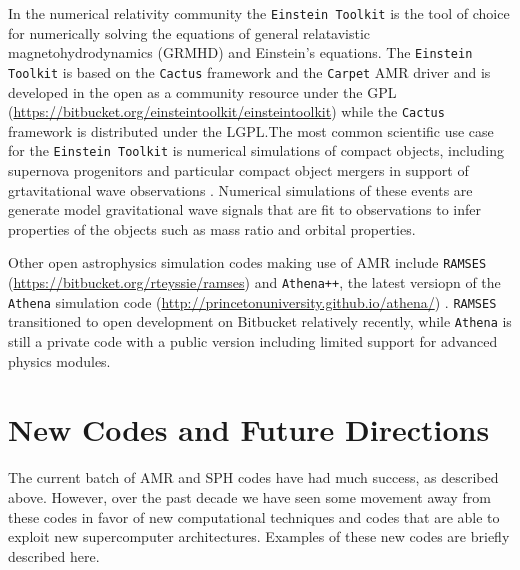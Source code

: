\documentclass[11pt,twoside]{article}
\begin{document}
In the numerical relativity community the \texttt{Einstein Toolkit} \citep{loffler2012} is the tool of choice for numerically solving the equations of general relatavistic magnetohydrodynamics (GRMHD) and Einstein's equations. The \texttt{Einstein Toolkit} is based on the \texttt{Cactus} framework and the \texttt{Carpet} AMR driver and is developed in the open as a community resource under the GPL \citep{loffler2013} (\url{https://bitbucket.org/einsteintoolkit/einsteintoolkit}) while the \texttt{Cactus} framework is distributed under the LGPL.\@  The most common scientific use case for the \texttt{Einstein Toolkit} is numerical simulations of compact objects, including supernova progenitors \citep{mosta2014} and particular compact object mergers in support of grtavitational wave observations \citep{ajith2012}. Numerical simulations of these events are generate model gravitational wave signals that are fit to observations to infer properties of the objects such as mass ratio and orbital properties.

Other open astrophysics simulation codes making use of AMR include \texttt{RAMSES} \citep{teyssier2002} (\url{https://bitbucket.org/rteyssie/ramses}) and \texttt{Athena++}, the latest versiopn of the \texttt{Athena} simulation code (\url{http://princetonuniversity.github.io/athena/}) \citep{stone2008}. \texttt{RAMSES} transitioned to open development on Bitbucket relatively recently, while \texttt{Athena} is still a private code with a public version including limited support for advanced physics modules.

\section{New Codes and Future Directions}
\label{usm}

The current batch of AMR and SPH codes have had much success, as described above. However, over the past decade we have seen some movement away from these codes in favor of new computational techniques and codes that are able to exploit new supercomputer architectures. Examples of these new codes are briefly described here.
\end{document}
